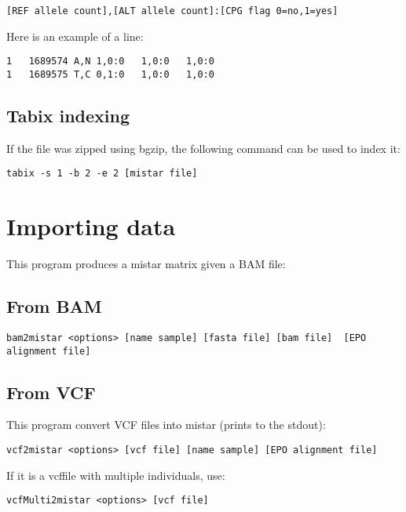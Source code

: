 \documentclass[a4paper]{article}
\begin{document}
\begin{verbatim}
[REF allele count],[ALT allele count]:[CPG flag 0=no,1=yes]
\end{verbatim}

\noindent  Here is an example of a line:

\begin{verbatim}
1	1689574	A,N	1,0:0	1,0:0	1,0:0
1	1689575	T,C	0,1:0	1,0:0	1,0:0
\end{verbatim}


\subsection{Tabix indexing}

\noindent If the file was zipped using bgzip, the following command can be used to index it:
\begin{verbatim}
tabix -s 1 -b 2 -e 2 [mistar file]
\end{verbatim}

\section{Importing data}

This program produces a  mistar matrix given a BAM file:

\subsection{From BAM}

\small
\begin{verbatim} 
bam2mistar <options> [name sample] [fasta file] [bam file]  [EPO alignment file]
\end{verbatim} 
\normalsize

\subsection{From VCF}

This program convert VCF files into mistar (prints to the stdout):

\begin{verbatim}
vcf2mistar <options> [vcf file] [name sample] [EPO alignment file]
\end{verbatim}

If it is a vcffile with multiple individuals, use:
\begin{verbatim}
vcfMulti2mistar <options> [vcf file]
\end{verbatim}
\end{document}
